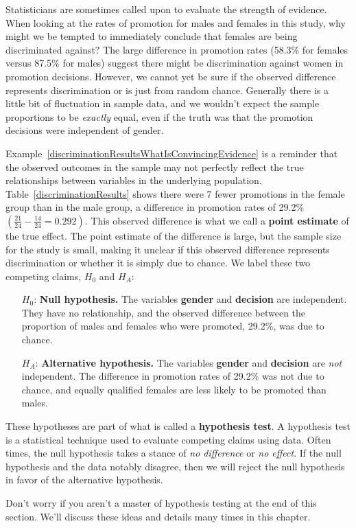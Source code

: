 \begin{example}{Statisticians are sometimes called upon to evaluate the strength of evidence. When looking at the rates of promotion for males and females in this study, why might we be tempted to immediately conclude that females are being discriminated against?}\label{discriminationResultsWhatIsConvincingEvidence}
The large difference in promotion rates (58.3\% for females versus 87.5\% for males) suggest there might be discrimination against women in promotion decisions. However, we cannot yet be sure if the observed difference represents discrimination or is just from random chance. Generally there is a little bit of fluctuation in sample data, and we wouldn't expect the sample proportions to be \emph{exactly} equal, even if the truth was that the promotion decisions were independent of gender.
\end{example}

Example~\ref{discriminationResultsWhatIsConvincingEvidence} is a reminder that the observed outcomes in the sample may not perfectly reflect the true relationships between variables in the underlying population. Table~\ref{discriminationResults} shows there were 7 fewer promotions in the female group than in the male group, a difference in promotion rates of 29.2\% $\left( \frac{21}{24} - \frac{14}{24} = 0.292 \right)$. This observed difference is what we call a \textbf{point estimate} of the true effect. The point estimate of the difference is large, but the sample size for the study is small, making it unclear if this observed difference represents discrimination or whether it is simply due to chance. We label these two competing claims, $H_0$ and $H_A$:
\begin{itemize}
\setlength{\itemsep}{0mm}
\item[$H_0$:] \textbf{Null hypothesis.} The variables \textbf{gender} and \textbf{decision} are independent. They have no relationship, and the observed difference between the proportion of males and females who were promoted, 29.2\%, was due to chance.
\item[$H_A$:] \textbf{Alternative hypothesis.} The variables \textbf{gender} and \textbf{decision} are \emph{not} independent. The difference in promotion rates of 29.2\% was not due to chance, and equally qualified females are less likely to be promoted than males.
\end{itemize}

\begin{termBox}{
These hypotheses are part of what is called a \textbf{hypothesis test}. A hypothesis test is a statistical technique used to evaluate competing claims using data. Often times, the null hypothesis takes a stance of \emph{no difference} or \emph{no effect}. If the null hypothesis and the data notably disagree, then we will reject the null hypothesis in favor of the alternative hypothesis. \vspace{3mm}

Don't worry if you aren't a master of hypothesis testing at the end of this section. We'll discuss these ideas and details many times in this chapter.}
\end{termBox}

